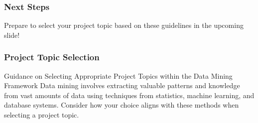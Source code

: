 \documentclass[aspectratio=169]{beamer}
\begin{document}
\begin{frame}[fragile]
    \frametitle{Next Steps}
    Prepare to select your project topic based on these guidelines in the upcoming slide!
\end{frame}

\begin{frame}[fragile]
  \frametitle{Project Topic Selection}
  
  \begin{block}{Guidance on Selecting Appropriate Project Topics within the Data Mining Framework}
  Data mining involves extracting valuable patterns and knowledge from vast amounts of data using techniques from statistics, machine learning, and database systems. Consider how your choice aligns with these methods when selecting a project topic.
  \end{block}
\end{frame}
\end{document}
